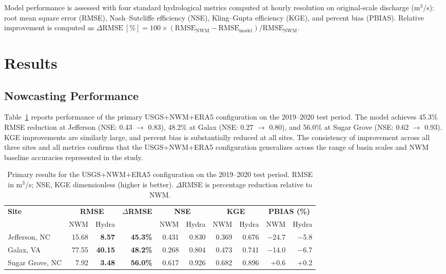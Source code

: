 \documentclass[draft]{agujournal2019}
\begin{document}
Model performance is assessed with four standard hydrological metrics computed at hourly resolution on original-scale discharge (m$^{3}$/s): root mean square error (RMSE), Nash--Sutcliffe efficiency (NSE), Kling--Gupta efficiency (KGE), and percent bias (PBIAS). Relative improvement is computed as $\Delta\text{RMSE}~[\%] = 100 \times (\text{RMSE}_{\text{NWM}} - \text{RMSE}_{\text{model}}) / \text{RMSE}_{\text{NWM}}$.



\section{Results}

\subsection{Nowcasting Performance}

Table~\ref{tab:primary_results} reports performance of the primary USGS+NWM+ERA5 configuration on the 2019--2020 test period. The model achieves 45.3\% RMSE reduction at Jefferson (NSE: 0.43 $\to$ 0.83), 48.2\% at Galax (NSE: 0.27 $\to$ 0.80), and 56.0\% at Sugar Grove (NSE: 0.62 $\to$ 0.93). KGE improvements are similarly large, and percent bias is substantially reduced at all sites. The consistency of improvement across all three sites and all metrics confirms that the USGS+NWM+ERA5 configuration generalizes across the range of basin scales and NWM baseline accuracies represented in the study.

\begin{table}
    \centering
    \caption{Primary results for the USGS+NWM+ERA5 configuration on the 2019--2020 test period. RMSE in m$^3$/s; NSE, KGE dimensionless (higher is better). $\Delta$RMSE is percentage reduction relative to NWM.}
    \small
    \begin{tabular}{l rr r rr rr rr}
        \toprule
        \textbf{Site} & \multicolumn{2}{c}{\textbf{RMSE}} & \textbf{$\Delta$RMSE} & \multicolumn{2}{c}{\textbf{NSE}} & \multicolumn{2}{c}{\textbf{KGE}} & \multicolumn{2}{c}{\textbf{PBIAS (\%)}} \\
        \cmidrule(lr){2-3}\cmidrule(lr){5-6}\cmidrule(lr){7-8}\cmidrule(lr){9-10}
         & NWM & Hydra & & NWM & Hydra & NWM & Hydra & NWM & Hydra \\
        \midrule
        Jefferson, NC  & 15.68 & \textbf{8.57}  & \textbf{45.3\%} & 0.431 & 0.830 & 0.369 & 0.676 & $-$24.7 & $-$5.8 \\
        Galax, VA      & 77.55 & \textbf{40.15} & \textbf{48.2\%} & 0.268 & 0.804 & 0.473 & 0.741 & $-$14.0 & $-$6.7 \\
        Sugar Grove, NC& 7.92  & \textbf{3.48}  & \textbf{56.0\%} & 0.617 & 0.926 & 0.682 & 0.896 & $+$0.6  & $+$0.2 \\
        \bottomrule
    \end{tabular}
    \label{tab:primary_results}
\end{table}
\end{document}
